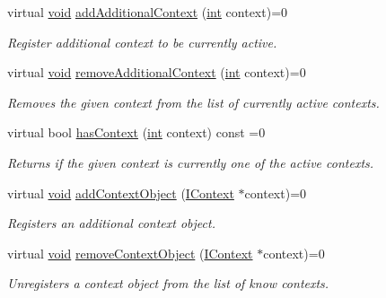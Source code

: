 \begin{DoxyCompactItemize}
virtual \hyperlink{group___u_a_v_objects_plugin_ga444cf2ff3f0ecbe028adce838d373f5c}{void} \hyperlink{group___core_plugin_gac04a98dd5b83cefd448fa47b5f5c9bea}{add\-Additional\-Context} (\hyperlink{ioapi_8h_a787fa3cf048117ba7123753c1e74fcd6}{int} context)=0
\begin{DoxyCompactList}\small\item\em Register additional context to be currently active. \end{DoxyCompactList}\item 
virtual \hyperlink{group___u_a_v_objects_plugin_ga444cf2ff3f0ecbe028adce838d373f5c}{void} \hyperlink{group___core_plugin_gaa15d98e15b7b7af2e1788e3101a4c963}{remove\-Additional\-Context} (\hyperlink{ioapi_8h_a787fa3cf048117ba7123753c1e74fcd6}{int} context)=0
\begin{DoxyCompactList}\small\item\em Removes the given {\itshape context} from the list of currently active contexts. \end{DoxyCompactList}\item 
virtual bool \hyperlink{group___core_plugin_ga1539030d8233cf72cf0159dec2aeab83}{has\-Context} (\hyperlink{ioapi_8h_a787fa3cf048117ba7123753c1e74fcd6}{int} context) const =0
\begin{DoxyCompactList}\small\item\em Returns if the given {\itshape context} is currently one of the active contexts. \end{DoxyCompactList}\item 
virtual \hyperlink{group___u_a_v_objects_plugin_ga444cf2ff3f0ecbe028adce838d373f5c}{void} \hyperlink{group___core_plugin_gafaeb9ae3d74d909c935810ae606b6ad9}{add\-Context\-Object} (\hyperlink{class_core_1_1_i_context}{I\-Context} $\ast$context)=0
\begin{DoxyCompactList}\small\item\em Registers an additional {\itshape context} object. \end{DoxyCompactList}\item 
virtual \hyperlink{group___u_a_v_objects_plugin_ga444cf2ff3f0ecbe028adce838d373f5c}{void} \hyperlink{group___core_plugin_ga4096e8d8e023fbd4b51574f274367b47}{remove\-Context\-Object} (\hyperlink{class_core_1_1_i_context}{I\-Context} $\ast$context)=0
\begin{DoxyCompactList}\small\item\em Unregisters a {\itshape context} object from the list of know contexts. \end{DoxyCompactList}\item 

\end{DoxyCompactItemize}
